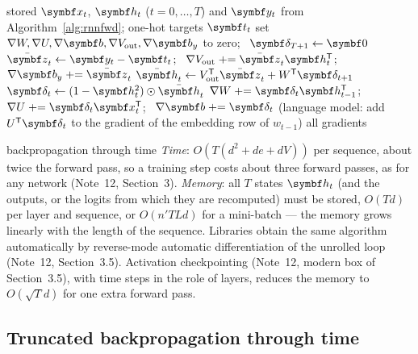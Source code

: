 \documentclass[11pt]{article}
\newcommand{\hv}{\vect{h}}
\newcommand{\bv}{\vect{b}}
\newcommand{\yv}{\vect{y}}
\newcommand{\zv}{\vect{z}}
\newcommand{\dv}{\vect{\delta}}
\begin{document}
\begin{algorithm}[htbp]
\caption{Backpropagation through time for one sequence (one tanh layer, softmax output)}\label{alg:bptt}
\begin{algorithmic}[1]
\Require stored $\x_t$, $\hv_t$ ($t = 0, \dots, T$) and $\yv_t$ from Algorithm~\ref{alg:rnnfwd}; one-hot targets $\vect{t}_t$
  \State set $\nabla W, \nabla U, \nabla\bv, \nabla V_{\mathrm{out}}, \nabla\bv_y$ to zero; \ $\dv_{T+1} \gets \vect{0}$
   
    \State $\bar{\zv}_t \gets \yv_t - \vect{t}_t$; \ $\nabla V_{\mathrm{out}} \mathrel{+}= \bar{\zv}_t\hv_t\T$; \ $\nabla\bv_y \mathrel{+}= \bar{\zv}_t$
    \State $\bar{\hv}_t \gets V_{\mathrm{out}}\T\bar{\zv}_t + W\T\dv_{t+1}$ 
    \State $\dv_t \gets (1 - \hv_t^2) \odot \bar{\hv}_t$
    \State $\nabla W \mathrel{+}= \dv_t\hv_{t-1}\T$; \ $\nabla U \mathrel{+}= \dv_t\x_t\T$; \ $\nabla\bv \mathrel{+}= \dv_t$
    \State (language model: add $U\T\dv_t$ to the gradient of the embedding row of $w_{t-1}$)
  \EndFor
  \State \Return all gradients
\EndFunction
\end{algorithmic}
\end{algorithm}

\begin{runtime}{backpropagation through time}
\emph{Time}: $O(T(d^2 + de + dV))$ per sequence, about twice the forward pass, so a training step costs about three
forward passes, as for any network (Note~12, Section~3). \emph{Memory}: all $T$ states $\hv_t$ (and the outputs, or
the logits from which they are recomputed) must be stored, $O(Td)$ per layer and sequence, or $O(n'TLd)$ for a mini-batch
--- the memory grows linearly with the length of the sequence. Libraries obtain the same algorithm automatically by
reverse-mode automatic differentiation of the unrolled loop (Note~12, Section~3.5). Activation checkpointing (Note~12,
modern box of Section~3.5), with time steps in the role of layers, reduces the memory to $O(\sqrt{T}d)$ for one extra
forward pass.
\end{runtime}

\subsection{Truncated backpropagation through time}\label{sec:tbptt}
\end{document}
